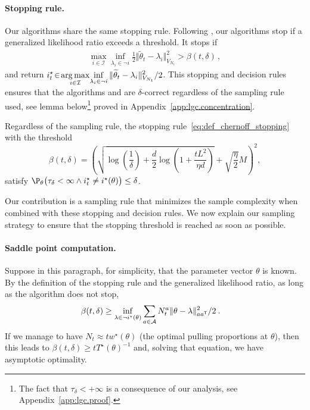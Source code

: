 \paragraph{Stopping rule.}
Our algorithms share the same stopping rule. Following \citet{garivier2016tracknstop}, our algorithms stop if a generalized likelihood ratio exceeds a threshold. It stops if
\begin{align}
\label{eq:def_chernoff_stopping}
\max_{i\in \mathcal I} \inf_{\lambda_i \in \neg i}\frac{1}{2}\Vert \tilde{\theta}_t - \lambda_i \Vert^2_{V_{N_t}}
> \beta(t,\delta)\,,
\end{align}
and return {\small $\displaystyle i^\star_t\! \in\! \operatorname*{arg\,max}_{i\in \mathcal I}\! \inf_{\lambda_i \in \neg i}\Vert \widetilde{\theta}_t - \lambda_i \Vert^2_{V_{N_t}}/2$}.
This stopping and decision rules ensures that the algorithms \LG and \LGC are $\delta$-correct regardless of the sampling rule used, see lemma below\footnote{The fact that $\tau_\delta <+\infty$ is a consequence of our analysis, see Appendix~\ref{app:lgc.proof}.} proved in Appendix~\ref{app:lgc.concentration}.
\begin{lemma}
\label{lem:chernoff_stopping rule_pac}
Regardless of the sampling rule, the stopping rule~\eqref{eq:def_chernoff_stopping} with the threshold
{\small\begin{equation} \label{eq:def_beta}
\beta(t,\delta) =\left( \sqrt{\log\!\left( \frac{1}{\delta}\right)+\frac{d}{2}\log\!\left(1+\frac{t L^2}{\eta d} \right)} +\sqrt{\frac{\eta}{2}}M\right)^2\!\!\!,
\end{equation}}
satisfy $ \P_{\theta}\big(\tau_{\delta} < \infty \wedge \istar_t \neq \istar(\theta)\big) \leq \delta$.
\end{lemma}
Our contribution is a sampling rule that minimizes the sample complexity when combined with these stopping and decision rules.
We now explain our sampling strategy to ensure that the stopping threshold is reached as soon as possible.

\paragraph{Saddle point computation.}
Suppose in this paragraph, for simplicity, that the parameter vector $\theta$ is known. By the definition of the stopping rule and the generalized likelihood ratio, as long as the algorithm does not stop,
\begin{align*}
\beta(t,\delta)
&\ge \inf_{\lambda\in \neg i^\star(\theta)} \sum_{a\in \mathcal{A}} N_t^a \Vert \theta - \lambda \Vert^2_{a a^{\mathsf{\scriptscriptstyle T}}}/2 \: .
\end{align*}
If we manage to have $N_t \approx t w^\star(\theta)$ (the optimal pulling proportions at $\theta$), then this leads to $\beta(t,\delta) \ge t T^\star(\theta)^{-1}$ and, solving that equation, we have asymptotic optimality.

